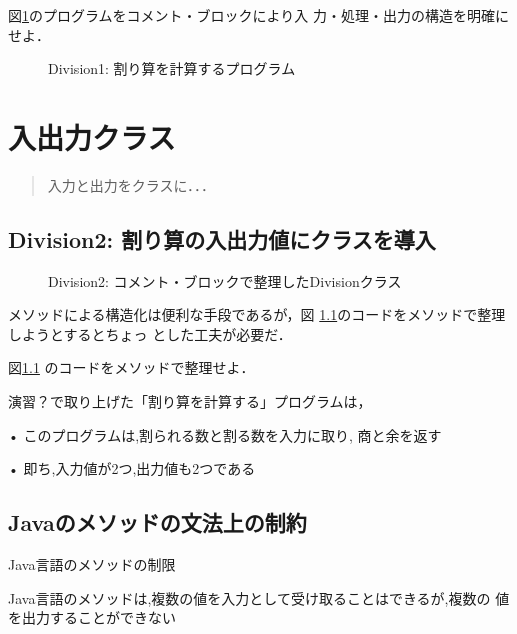 \documentclass[a4j, twoside]{jsbook}
\begin{document}
\begin{演習}
 図\ref{fig:Division1:Division}のプログラムをコメント・ブロックにより入
 力・処理・出力の構造を明確にせよ．
\end{演習}

\begin{figure}
 
 \caption{Division1: 割り算を計算するプログラム}\label{fig:Division1:Division}
\end{figure}


\chapter{入出力クラス}

\begin{abstract}
 入力と出力をクラスに．．．
\end{abstract}

\section{Division2: 割り算の入出力値にクラスを導入}

\begin{figure}
 
 \caption{Division2: コメント・ブロックで整理したDivisionクラス}\label{fig:Division2:Division}
\end{figure}

メソッドによる構造化は便利な手段であるが，図
\ref{fig:Division2:Division}のコードをメソッドで整理しようとするとちょっ
とした工夫が必要だ．

\begin{例題}
 図\ref{fig:Division2:Division} のコードをメソッドで整理せよ．
\end{例題}

演習？で取り上げた「割り算を計算する」プログラムは，

• このプログラムは,割られる数と割る数を入力に取り,
商と余を返す

• 即ち,入力値が2つ,出力値も2つである

\section{Javaのメソッドの文法上の制約}

Java言語のメソッドの制限

 Java言語のメソッドは,複数の値を入力として受け取ることはできるが,複数の
値を出力することができない
\end{document}
